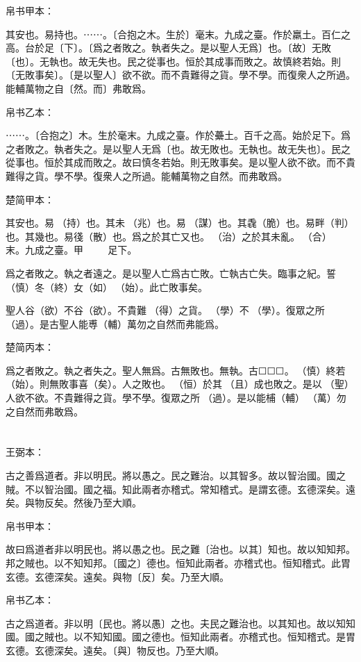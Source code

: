 \documentclass[a5paper]{ctexbook}
\begin{document}
    
    帛书甲本：

    其安也。易持也。⋯⋯。〔合抱之木。生於〕毫末。九成之臺。作於羸土。百仁之高。台於足〔下〕。〔爲之者敗之。執者失之。是以聖人无爲〕也。〔故〕无敗〔也〕。无執也。故无失也。民之從事也。恒於其成事而敗之。故慎終若始。則〔无敗事矣〕。〔是以聖人〕欲不欲。而不貴難得之貨。學不學。而復衆人之所過。能輔萬物之自〔然。而〕弗敢爲。

    帛书乙本：

    ⋯⋯。〔合抱之〕木。生於毫末。九成之臺。作於虆土。百千之高。始於足下。爲之者敗之。執者失之。是以聖人无爲〔也。故无敗也。无執也。故无失也〕。民之從事也。恒於其成而敗之。故曰慎冬若始。則无敗事矣。是以聖人欲不欲。而不貴難得之貨。學不學。復衆人之所過。能輔萬物之自然。而弗敢爲。

    楚简甲本：

    其安也。易𣏔（持）也。其未󶵆（兆）也。易𢘃（謀）也。其毳（脆）也。易畔（判）也。其幾也。易㣤（散）也。爲之於其亡又也。𥿆（治）之於其未亂。𣌭（合）☐☐☐☐☐☐末。九成之臺。甲☐☐☐☐☐☐☐☐☐足下。

    爲之者敗之。執之者遠之。是以聖人亡爲古亡敗。亡執古亡失。臨事之紀。誓（慎）冬（終）女（如）󶴢（始）。此亡敗事矣。

    聖人谷（欲）不谷（欲）。不貴難󶴫（得）之貨。𡥈（學）不𡥈（學）。復眾之所󶴬（過）。是古聖人能尃（輔）萬勿之自然而弗能爲。

    楚简丙本：

    爲之者敗之。執之者失之。聖人無爲。古無敗也。無執。古☐☐☐。󶴤（慎）終若󶴪（始）。則無敗事喜（矣）。人之敗也。𠄨（恒）於其𠭯（且）成也敗之。是以☐（聖）人欲不欲。不貴難得之貨。學不學。復眾之所󶴭（過）。是以能㭪（輔）󼧕（萬）勿之自然而弗敢爲。

    \chapter{}
    王弼本：

    古之善爲道者。非以明民。將以愚之。民之難治。以其智多。故以智治國。國之賊。不以智治國。國之福。知此兩者亦稽式。常知稽式。是謂玄德。玄德深矣。遠矣。與物反矣。然後乃至大順。

    
    帛书甲本：

    故曰爲道者非以明民也。將以愚之也。民之難〔治也。以其〕知也。故以知知邦。邦之賊也。以不知知邦。〔國之〕德也。恒知此兩者。亦稽式也。恒知稽式。此胃玄德。玄德深矣。遠矣。與物〔反〕矣。乃至大順。

    帛书乙本：

    古之爲道者。非以明〔民也。將以愚〕之也。夫民之難治也。以其知也。故以知知國。國之賊也。以不知知國。國之德也。恒知此兩者。亦稽式也。恒知稽式。是胃玄德。玄德深矣。遠矣。〔與〕物反也。乃至大順。
\end{document}
